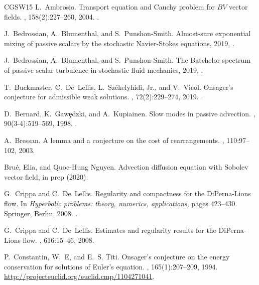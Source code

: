 \documentclass[12pt]{report}   %
\numberwithin{equation}{section}
\theoremstyle{plain}
\theoremstyle{definition}
\theoremstyle{remark}
\begin{document}
\begin{thebibliography}{CGSW15}
L.~Ambrosio.
\newblock Transport equation and {C}auchy problem for {$BV$} vector fields.
, 158(2):227--260, 2004.
\newblock {}.

J.~Bedrossian, A.~Blumenthal, and S.~Punshon-Smith.
\newblock Almost-sure exponential mixing of passive scalars by the stochastic
  {N}avier-{S}tokes equations, 2019,
  .


J.~Bedrossian, A.~Blumenthal, and S.~Punshon-Smith.
\newblock The Batchelor spectrum of passive scalar turbulence in stochastic fluid mechanics, 2019,
  .
  
  
T.~Buckmaster, C.~De~Lellis, L.~Sz\'{e}kelyhidi, Jr., and V.~Vicol.
\newblock Onsager's conjecture for admissible weak solutions.
, 72(2):229--274, 2019.
\newblock {}.

D.~Bernard, K.~Gaw\c{e}dzki, and A.~Kupiainen.
\newblock Slow modes in passive advection.
, 90(3-4):519--569, 1998.
\newblock {}.

A.~Bressan.
\newblock A lemma and a conjecture on the cost of rearrangements.
, 110:97--102, 2003.

Bru\'{e}, Elia, and Quoc-Hung Nguyen.
\newblock  Advection diffusion equation with Sobolev vector field, in prep (2020).


G.~Crippa and C.~De~Lellis.
\newblock Regularity and compactness for the {D}i{P}erna-{L}ions flow.
\newblock In {\em Hyperbolic problems: theory, numerics, applications}, pages
  423--430. Springer, Berlin, 2008.
\newblock {}.

G.~Crippa and C.~De~Lellis.
\newblock Estimates and regularity results for the {D}i{P}erna-{L}ions flow.
, 616:15--46, 2008.

P.~Constantin, W.~E, and E.~S. Titi.
\newblock Onsager's conjecture on the energy conservation for solutions of
  {E}uler's equation.
, 165(1):207--209, 1994.
\newblock \urlprefix\url{http://projecteuclid.org/euclid.cmp/1104271041}.


\end{thebibliography}
\end{document}
